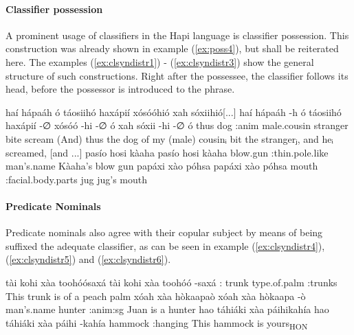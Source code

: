 \documentclass[a4paper, 12pt, oneside]{memoir}
\begin{document}
\paragraph{Classifier possession}
A prominent usage of classifiers in the Hapi language is classifier possession. This construction was already shown in example (\ref{ex:poss4}), but shall be reiterated here. The examples (\ref{ex:clsyndistr1}) - (\ref{ex:clsyndistr3}) show the general structure of such constructions. Right after the possessee, the classifier follows its head, before the possessor is introduced to the phrase. 
\begin{examples}
\newbaarucmd{\cl}{\baarujuncture{\texttt{==}}}
\ex \label{ex:clsyndistr1}
\words haí hápaáh ó táosiihó haxápií xósóóhió xah sóxiihió[...] 
\bits haí hápaáh -h ó táosiihó haxápií -∅ xósóó -hi -∅ \cl ó xah sóxii -hi -∅ \cl ó 
\gloss thus dog {\Erg} {\Cl}:anim male.cousin stranger {\Abs} bite {\Rpastt} {\St} {\Seq} {\Fourth}  scream {\Rpastt} {\St} {\Seq}
\tr (And) thus the dog of my (male) cousinᵢ bit the strangerⱼ, and heᵢ screamed, [and ...]
\ex \label{ex:clsyndistr2}
\words pasío hosi kàaha
\bits pasío hosi kàaha 
\gloss blow.gun {\Cl}:thin.pole.like man's.name
\tr Kàaha's blow gun
\ex \label{ex:clsyndistr3}
\words papáxi xào póhsa
\bits papáxi xào póhsa
\gloss mouth {\Cl}:facial.body.parts jug
\tr jug's mouth
\end{examples}
\paragraph{Predicate Nominals}
Predicate nominals also agree with their copular subject by means of being suffixed the adequate classifier, as can be seen in example (\ref{ex:clsyndistr4}), (\ref{ex:clsyndistr5}) and (\ref{ex:clsyndistr6}). 
\begin{examples}
\ex \label{ex:clsyndistr4}
\words tài kohi xàa toohóósaxá
\bits tài kohi xàa toohóó -saxá
\gloss {\Dem}:{\Prox} trunk {\Cop} type.of.palm {\Cl}:trunks
\tr This trunk is of a peach palm
\ex \label{ex:clsyndistr5}
\words xóah xàa hòkaapaò
\bits xóah xàa hòkaapa -ò
\gloss man's.name {\Cop} hunter {\Cl}:anim:sg
\tr Juan is a hunter
\ex \label{ex:clsyndistr6}
\words hao táhiáki xàa páihikahía
\bits hao táhiáki xàa páihi -kahía
\gloss {\Dem} hammock {\Cop} {\Sshposs} {\Cl}:hanging
\tr This hammock is yours\textsubscript{HON}
\end{examples}
\end{document}
